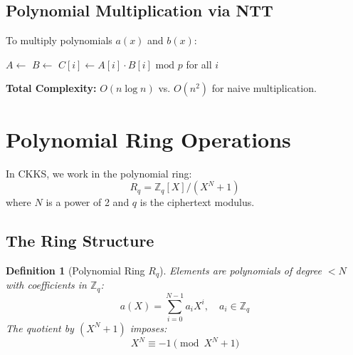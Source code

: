 \documentclass[11pt,a4paper]{article}
\newtheorem{definition}{Definition}
\newcommand{\Zq}{\mathbb{Z}_q}
\newcommand{\Rq}{R_q}
\newcommand{\bmod}{\text{ mod }}
\begin{document}
\subsection{Polynomial Multiplication via NTT}

To multiply polynomials $a(x)$ and $b(x)$:

\begin{algorithm}[H]
\caption{NTT Polynomial Multiplication}
\begin{algorithmic}[1]
    \State $A \gets$ 
    \State $B \gets$ 
    \State $C[i] \gets A[i] \cdot B[i] \bmod p$ for all $i$ 
    \State \Return {}
\EndFunction
\end{algorithmic}
\end{algorithm}

\textbf{Total Complexity:} $O(n \log n)$ vs. $O(n^2)$ for naive multiplication.

\section{Polynomial Ring Operations}

In CKKS, we work in the polynomial ring:
\[
\Rq = \Zq[X]/(X^N + 1)
\]
where $N$ is a power of 2 and $q$ is the ciphertext modulus.

\subsection{The Ring Structure}

\begin{definition}[Polynomial Ring $\Rq$]
Elements are polynomials of degree $< N$ with coefficients in $\Zq$:
\[
a(X) = \sum_{i=0}^{N-1} a_i X^i, \quad a_i \in \Zq
\]
The quotient by $(X^N + 1)$ imposes:
\[
X^N \equiv -1 \pmod{X^N + 1}
\]
\end{definition}

\end{document}
